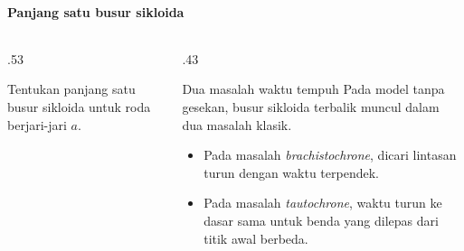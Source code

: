 \documentclass{../../kalkulus-ppt}
\begin{document}
\begin{frame}{\insertsection}
    \framesubtitle{Panjang satu busur sikloida}
    \begin{columns}[c,onlytextwidth]
        \begin{column}{.53\textwidth}
            \begin{contoh}
                Tentukan panjang satu busur sikloida
                untuk roda berjari-jari $a$.
            \end{contoh}
        \end{column}
        \begin{column}{.43\textwidth}
            \begin{block}{Dua masalah waktu tempuh}
                Pada model tanpa gesekan, busur sikloida
                terbalik muncul dalam dua masalah klasik.
                \begin{itemize}
                    \item Pada masalah \emph{brachistochrone},
                    dicari lintasan turun dengan waktu terpendek.
                    \item Pada masalah \emph{tautochrone},
                    waktu turun ke dasar sama untuk
                    benda yang dilepas dari titik awal berbeda.
                \end{itemize}
            \end{block}
        \end{column}
    \end{columns}
\end{frame}
\end{document}
